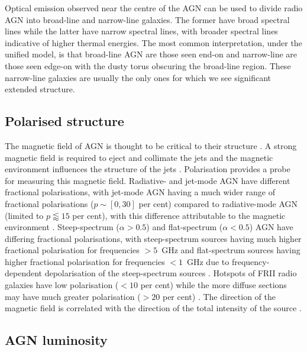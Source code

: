 \documentclass[11pt, a4paper]{book}
\providecommand{\DIFaddtex}[1]{{\protect\color{blue}\uwave{#1}}} %
\providecommand{\DIFaddbegin}{} %
\providecommand{\DIFaddend}{} %
\providecommand{\DIFadd}[1]{\texorpdfstring{\DIFaddtex{#1}}{#1}} %
\newcommand{\DIFaddincludegraphics}[2][]{{\color{blue}\fbox{\DIFOincludegraphics[#1]{#2}}}} %
\DeclareRobustCommand{\DIFaddbegin}{\DIFOaddbegin \let\includegraphics\DIFaddincludegraphics} %
\DeclareRobustCommand{\DIFaddend}{\DIFOaddend \let\includegraphics\DIFOincludegraphics} %
\begin{document}
        Optical emission observed near the centre of the AGN can be used to divide radio AGN into broad-line and narrow-line galaxies. The former have broad spectral lines while the latter have narrow spectral lines, with broader spectral lines indicative of higher thermal energies. The most common interpretation, under the unified model, is that broad-line AGN are those seen end-on and narrow-line are those seen edge-on with the dusty torus obscuring the broad-line region. These narrow-line galaxies are usually the only ones for which we see significant extended structure.

    \subsection{Polarised structure}
    \label{sec:polarised-structure-of-agn}

        The magnetic field of AGN is thought to be critical to their structure \citep{sikora_magnetic_2013}. A strong magnetic field is required to eject and collimate the jets \citep{lovelace_dynamo_1976} and the magnetic environment influences the structure of the jets \citep{osullivan_magnetic_2015}. Polarisation provides a probe for measuring this magnetic field. Radiative- and jet-mode AGN have different fractional polarisations, with jet-mode AGN having a much wider range of fractional polarisations ($p \sim [0, 30]$ per cent) compared to radiative-mode AGN (limited to $p \lessapprox 15$ per cent), with this difference attributable to the magnetic environment \citep{osullivan_magnetic_2015}. Steep-spectrum ($\alpha > 0.5$) and flat-spectrum ($\alpha < 0.5$) AGN have differing fractional polarisations, with steep-spectrum sources having much higher fractional polarisation for frequencies $> 5$~GHz and flat-spectrum sources having higher fractional polarisation for frequencies $< 1$~GHz due to frequency-dependent depolarisation of the steep-spectrum sources \citep{saikia_polarization_1988}. Hotspots of FRII radio galaxies have low polarisation ($<10$ per cent) while the more diffuse sections may have much greater polarisation ($>20$ per cent) \citep{saikia_polarization_1988}. The direction of the magnetic field is correlated with the direction of \DIFaddbegin \DIFadd{patterns in }\DIFaddend the total intensity of the source \citep{saikia_polarization_1988}.

    \subsection{AGN luminosity}
    \label{sec:agn-throughout}
\end{document}
